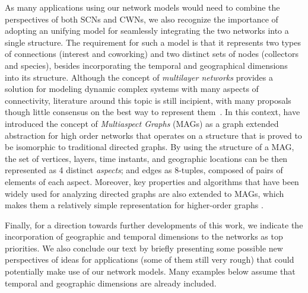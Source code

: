 As many applications using our network models would need to combine the perspectives of both SCNs and CWNs, we also recognize the importance of adopting an unifying model for seamlessly integrating the two networks into a single structure.
The requirement for such a model is that it represents two types of connections (interest and coworking) and two distinct sets of nodes (collectors and species), besides incorporating the temporal and geographical dimensions into its structure.
Although the concept of \textit{multilayer networks} provides a solution for modeling dynamic complex systems with many aspects of connectivity, literature around this topic is still incipient, with many proposals though little consensus on the best way to represent them~\cite{Kivela2014}.
In this context,  have introduced the concept of \textit{Multiaspect Graphs} (MAGs) as a graph extended abstraction for high order networks that operates on a structure that is proved to be isomorphic to traditional directed graphs.
By using the structure of a MAG, the set of vertices, layers, time instants, and geographic locations can be then represented as 4 distinct \textit{aspects}; and edges as $8$-tuples, composed of pairs of elements of each aspect.
Moreover, key properties and algorithms that have been widely used for analyzing directed graphs are also extended to MAGs, which makes them a relatively simple representation for higher-order graphs \cite{Wehmuth2015}.

Finally, for a direction towards further developments of this work, we indicate the incorporation of geographic and temporal dimensions to the networks as top priorities.
We also conclude our text by briefly presenting some possible new perspectives of ideas for applications (some of them still very rough) that could potentially make use of our network models. 
Many examples below assume that temporal and geographic dimensions are already included.


